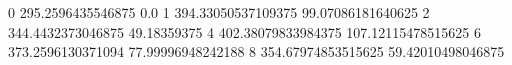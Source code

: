 0 295.2596435546875 0.0
1 394.33050537109375 99.07086181640625
2 344.4432373046875 49.18359375
4 402.38079833984375 107.12115478515625
6 373.2596130371094 77.99996948242188
8 354.67974853515625 59.42010498046875
